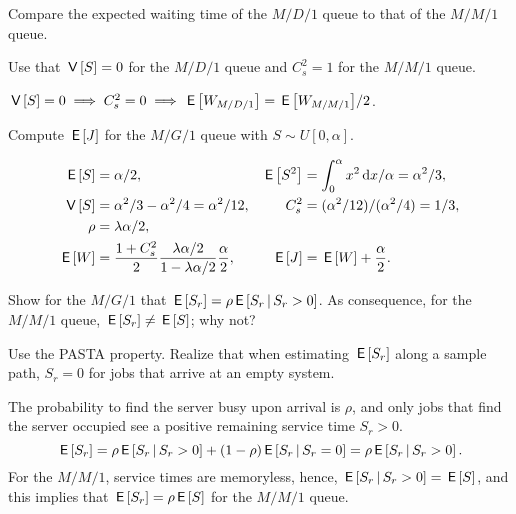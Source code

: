 \documentclass[stochastic-or.tex]{subfiles}
\begin{document}
\begin{exercise}
Compare  the expected waiting time of the $M/D/1$ queue to that of the $M/M/1$ queue. %
\begin{hint}
Use that $\,\mathsf{V}\left[S\right]=0$ for the $M/D/1$ queue and $C_{s}^{2} = 1$ for the $M/M/1$ queue.
\end{hint}
\begin{solution}
$\,\mathsf{V}\left[S\right] = 0 \implies C_s^2 = 0 \implies \,\mathsf{E}\left[W_{M/D/1}\right] = {\,\mathsf{E}\left[W_{M/M/1}\right]}/2$.
\end{solution}
\end{exercise}

\begin{exercise}
 Compute $\,\mathsf{E}\left[J\right]$ for the $M/G/1$ queue with $S\sim U[0,\alpha]$.
\begin{solution}
 \begin{align*}
\,\mathsf{E}\left[S\right] &= \alpha/2, & \,\mathsf{E}\left[S^2\right] &= \int_0^\alpha x^2 \,\textrm{d}x/\alpha = \alpha^2/3,\\
\,\mathsf{V}\left[S\right] &= \alpha^2/3 - \alpha^2/4= \alpha^2/12, & C_s^2 &= (\alpha^2/12)/(\alpha^2/4) = 1/3,\\
\rho &= \lambda \alpha/2,\\
\,\mathsf{E}\left[W\right] &= \frac{1+C_s^2}2 \frac{\lambda \alpha/2}{1-\lambda \alpha/2}\frac \alpha2, &
\,\mathsf{E}\left[J\right] &= \,\mathsf{E}\left[W\right] + \frac \alpha2.
 \end{align*}
\end{solution}
\end{exercise}


\begin{exercise}\label{ex:5}
Show for the $M/G/1$ that $\,\mathsf{E}\left[S_r\right] = \rho \,\mathsf{E}\left[S_r\,\middle|\, S_r>0\right]$.
As consequence, for the $M/M/1$ queue, $\,\mathsf{E}\left[S_{r}\right] \neq \,\mathsf{E}\left[S\right]$; why not?
\begin{hint}
Use the PASTA property. Realize that when estimating $\,\mathsf{E}\left[S_r\right]$ along a sample path, $S_r=0$ for jobs that arrive at an empty system.
\end{hint}
\begin{solution}
 The probability to find the server busy upon arrival is $\rho$, and only jobs that find the server occupied see a positive remaining service time $S_r>0$.
\begin{equation*}
\,\mathsf{E}\left[S_r\right] = \rho \,\mathsf{E}\left[S_r\,\middle|\, S_r >0\right] + (1-\rho) \,\mathsf{E}\left[S_r\,\middle|\, S_r = 0\right] = \rho \,\mathsf{E}\left[S_r\,\middle|\, S_r>0\right].
\end{equation*}
For the $M/M/1$, service times are memoryless, hence, $\,\mathsf{E}\left[S_r \,\middle|\, S_r>0\right] = \,\mathsf{E}\left[S\right]$, and this implies that $\,\mathsf{E}\left[S_r\right] = \rho \,\mathsf{E}\left[S\right]$ for the $M/M/1$ queue.
\end{solution}
\end{exercise}
\end{document}

